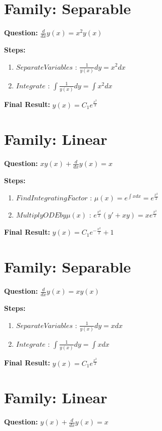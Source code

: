 \documentclass{article}
\begin{document}
\section*{Family: Separable}
\textbf{Question:} $\frac{d}{d x} y{\left(x \right)} = x^{2} y{\left(x \right)}$

\textbf{Steps:}
\begin{enumerate}
\item $Separate Variables$ :  $\frac{1}{y{\left(x \right)}} dy = x^{2} dx$
\item $Integrate$ :  $\int \frac{1}{y{\left(x \right)}} dy = \int x^{2} dx$
\end{enumerate}
\textbf{Final Result:} $y{\left(x \right)} = C_{1} e^{\frac{x^{3}}{3}}$

\section*{Family: Linear}
\textbf{Question:} $x y{\left(x \right)} + \frac{d}{d x} y{\left(x \right)} = x$

\textbf{Steps:}
\begin{enumerate}
\item $Find Integrating Factor$ :  $\mu(x) = e^{\int x dx} = e^{\frac{x^{2}}{2}}$
\item $Multiply ODE by \mu(x)$ :  $e^{\frac{x^{2}}{2}}(y' + xy) = x e^{\frac{x^{2}}{2}}$
\end{enumerate}
\textbf{Final Result:} $y{\left(x \right)} = C_{1} e^{- \frac{x^{2}}{2}} + 1$

\section*{Family: Separable}
\textbf{Question:} $\frac{d}{d x} y{\left(x \right)} = x y{\left(x \right)}$

\textbf{Steps:}
\begin{enumerate}
\item $Separate Variables$ :  $\frac{1}{y{\left(x \right)}} dy = x dx$
\item $Integrate$ :  $\int \frac{1}{y{\left(x \right)}} dy = \int x dx$
\end{enumerate}
\textbf{Final Result:} $y{\left(x \right)} = C_{1} e^{\frac{x^{2}}{2}}$

\section*{Family: Linear}
\textbf{Question:} $y{\left(x \right)} + \frac{d}{d x} y{\left(x \right)} = x$
\end{document}
